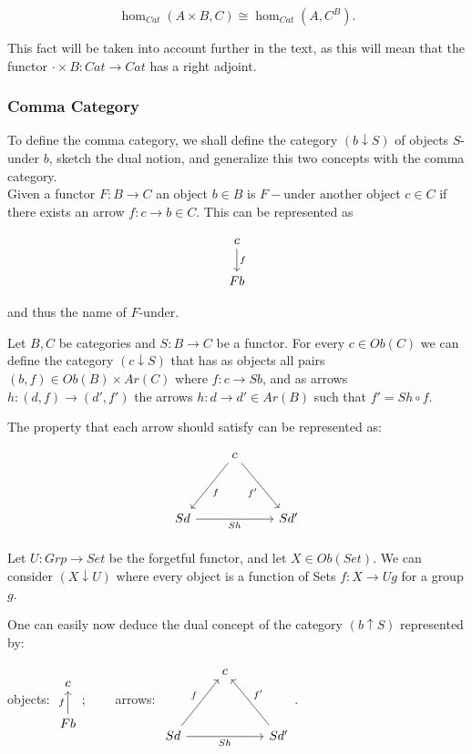 $$\hom_{Cat}(A\times B, C) \cong \hom_{Cat}(A, C^B).$$

This fact will be taken into account further in the text, as this will mean that the functor $\cdot \times B: Cat \to Cat$ has a right adjoint.
\subsubsection{Comma Category}

To define the comma category, we shall define the category $(b \downarrow S)$ of objects $S$-under $b$, sketch the dual notion, and generalize this two concepts with the comma category.\\

Given a functor $F:B\to C$ an object $b\in B$ is $F-$under another object $c\in C$ if there exists an arrow $f:c\to b \in C$. This can be represented as

$$
\begin{tikzcd}
  c
  \ar[d,"f"]\\
  Fb
\end{tikzcd}
$$

and thus the name of $F$-under.

\begin{definition}
  Let $B,C$ be  categories and $S:B\to C$ be a functor. For every $c\in Ob(C)$ we can define the category $(c \downarrow S)$ that has as objects all pairs $(b,f) \in Ob(B)\times Ar(C)$ where $f:c\to Sb$, and as arrows $h:(d,f) \to (d',f')$ the arrows $h:d\to d'\in Ar(B)$ such that $f' = Sh\circ f$.
\end{definition}

The property that each arrow should satisfy can be represented as:
\[
  \begin{tikzpicture}
    \node {\begin{tikzcd}
        & c\ar[ddl, "f"]\ar[ddr,"f'",swap] & \\
        &&\\
        Sd\ar[rr, "Sh", swap] & & Sd'
      \end{tikzcd}};
  \end{tikzpicture}
\]

\begin{example} Let $U:Grp \to Set$ be the forgetful functor, and let $X\in Ob(Set)$. We can consider $(X\downarrow U)$ where every object is a function of Sets $f: X\to Ug$ for a group $g$.  
\end{example}

One can easily now deduce the dual concept of the category $(b\uparrow S)$ represented by: \\
\begin{center}
  objects: $
  \begin{tikzcd}
    c
    \\
    Fb\ar[u,"f"]
  \end{tikzcd}
  $;$\qquad$ arrows: $\begin{tikzcd}
    & c & \\
    &&\\
    Sd\ar[rr, "Sh", swap]\ar[uur, "f"] & & Sd'\ar[uul,"f'",swap]
  \end{tikzcd}$.
\end{center}

